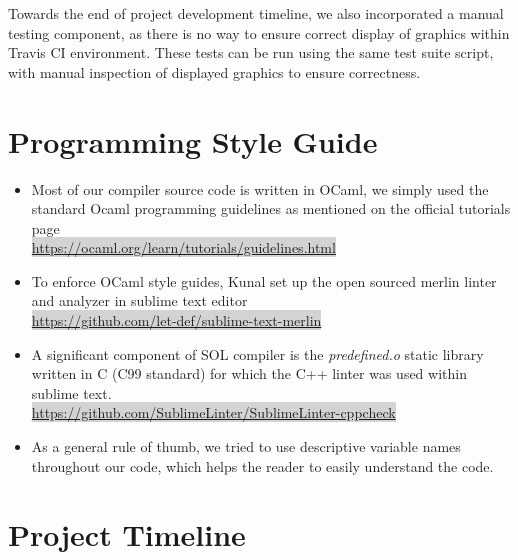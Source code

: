 \documentclass[letterpaper,12pt]{report}
\begin{document}
      Towards the end of project development timeline, we also incorporated a manual testing component, as there is no way to ensure correct display of graphics within Travis CI environment. These tests can be run using the same test suite script, with manual inspection of displayed graphics to ensure correctness.\\

  \section{Programming Style Guide}
    \begin{itemize}
      \itemsep 0em
      \item Most of our compiler source code is written in OCaml, we simply used the standard Ocaml programming guidelines as mentioned on the official tutorials page\\
      \colorbox{lightgray}{\href{https://ocaml.org/learn/tutorials/guidelines.html}{https://ocaml.org/learn/tutorials/guidelines.html}}

      \item To enforce OCaml style guides, Kunal set up the open sourced merlin linter and analyzer in sublime text editor\\
      \colorbox{lightgray}{\href{https://github.com/let-def/sublime-text-merlin}{https://github.com/let-def/sublime-text-merlin}}

      \item A significant component of SOL compiler is the \textit{predefined.o} static library written in C (C99 standard) for which the C++ linter was used within sublime text.\\
      \colorbox{lightgray}{\href{ https://github.com/SublimeLinter/SublimeLinter-cppcheck}{ https://github.com/SublimeLinter/SublimeLinter-cppcheck}}

      \item As a general rule of thumb, we tried to use descriptive variable names throughout our code, which helps the reader to easily understand the code.
    \end{itemize}

  \section{Project Timeline}
\end{document}
